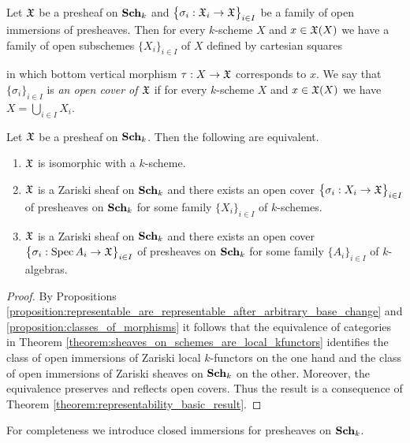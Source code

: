 \begin{definition}
Let ${\mathfrak X}$ be a presheaf on $\mathbf{Sch}_k$ and $\big\{\sigma_i:{\mathfrak X}_i\rightarrow {\mathfrak X}\big\}_{i\in I}$ be a family of open immersions of presheaves. Then for every $k$-scheme $X$ and $x\in {\mathfrak X}(X)$ we have a family of open subschemes $\{X_i\}_{i\in I}$ of $X$ defined by cartesian squares
\begin{center}
\end{center}
in which bottom vertical morphism $\tau:X \rightarrow {\mathfrak X}$ corresponds to $x$. We say that $\{\sigma_i\}_{i\in I}$ is \textit{an open cover of ${\mathfrak X}$} if for every $k$-scheme $X$ and $x\in {\mathfrak X}(X)$ we have $X = \bigcup_{i\in I}X_i$.
\end{definition}

\begin{theorem}\label{theorem:representability_basic_result_Zariski_sheaves}
Let ${\mathfrak X}$ be a presheaf on $\mathbf{Sch}_k$. Then the following are equivalent.
\begin{enumerate}[label=\emph{\textbf{(\roman*)}}, leftmargin=3.0em]
\item ${\mathfrak X}$ is isomorphic with a $k$-scheme.
\item ${\mathfrak X}$ is a Zariski sheaf on $\mathbf{Sch}_k$ and there exists an open cover $\big\{\sigma_i:X_i \rightarrow {\mathfrak X}\big\}_{i\in I}$ of presheaves on $\mathbf{Sch}_k$ for some family $\{X_i\}_{i\in I}$ of $k$-schemes.
\item ${\mathfrak X}$ is a Zariski sheaf on $\mathbf{Sch}_k$ and there exists an open cover $\big\{\sigma_i:\mathrm{Spec}\, A_i \rightarrow {\mathfrak X}\big\}_{i\in I}$ of presheaves on $\mathbf{Sch}_k$ for some family $\{A_i\}_{i\in I}$ of $k$-algebras.
\end{enumerate}
\end{theorem}
\begin{proof}
By Propositions \ref{proposition:representable_are_representable_after_arbitrary_base_change} and \ref{proposition:classes_of_morphisms} it follows that the equivalence of categories in Theorem \ref{theorem:sheaves_on_schemes_are_local_kfunctors} identifies the class of open immersions of Zariski local $k$-functors on the one hand and the class of open immersions of Zariski sheaves on $\mathbf{Sch}_k$ on the other. Moreover, the equivalence preserves and reflects open covers. Thus the result is a consequence of Theorem \ref{theorem:representability_basic_result}.
\end{proof}
\noindent
For completeness we introduce closed immersions for presheaves on $\mathbf{Sch}_k$.

